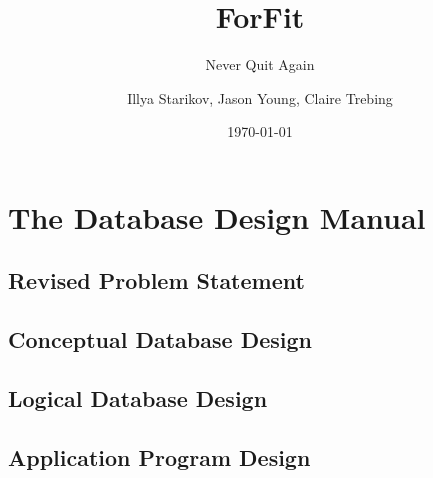 \documentclass[oneside]{scrbook}
\title{ForFit}
\subtitle{Never Quit Again}
\author{Illya Starikov, Jason Young, Claire Trebing}
\date{\today}
\begin{document}
\maketitle

\chapter{The Database Design Manual}
\section{Revised Problem Statement}


\section{Conceptual Database Design}


\section{Logical Database Design}


\section{Application Program Design}

\end{document}
